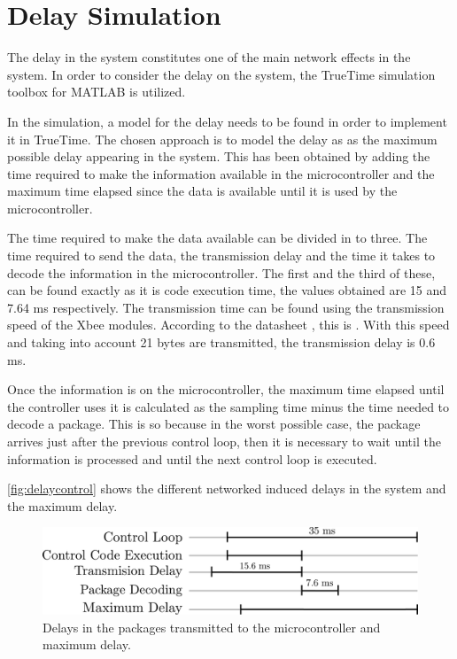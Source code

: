 \section{Delay Simulation}
The delay in the system constitutes one of the main network effects in the system. In order to consider the delay on the system, the TrueTime simulation toolbox for MATLAB is utilized. 

In the simulation, a model for the delay needs to be found in order to implement it in TrueTime. The chosen approach is to model the delay as as the maximum possible delay appearing in the system. This has been obtained by adding the time required to make the information available in the microcontroller and the maximum time elapsed since the data is available until it is used by the microcontroller. 

The time required to make the data available can be divided in to three. The time required to send the data, the transmission delay and the time it takes to decode the information in the microcontroller. The first and the third of these, can be found exactly as it is code execution time, the values obtained are 15 and 7.64 ms respectively. The transmission time can be found using the transmission speed of the Xbee modules. According to the datasheet , this is . With this speed and taking into account 21 bytes are transmitted, the transmission delay is 0.6 ms.

Once the information is on the microcontroller, the maximum time elapsed until the controller uses it is calculated as the sampling time minus the time needed to decode a package. This is so because in the worst possible case, the package arrives just after the previous control loop, then it is necessary to wait until the information is processed and until the next control loop is executed. 

\autoref{fig:delaycontrol} shows the different networked induced delays in the system and the maximum delay. 
\begin{figure}[H]
	\centering
	\includegraphics[width=.6\textwidth]{figures/maxDelay.pdf}
	\caption{Delays in the packages transmitted to the microcontroller and maximum delay.}
	\label{fig:delaycontrol}
\end{figure}

